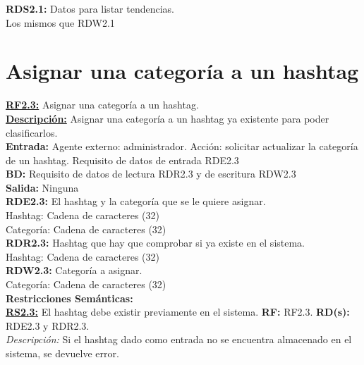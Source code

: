 \textcolor{azul}{\textbf{RDS2.1:}} Datos para listar tendencias. \\
\hspace*{1cm} Los mismos que RDW2.1\\

\pagebreak

\section{Asignar una categoría a un hashtag}
\textbf{\textcolor{rojo}{\underline{RF2.3:}}} Asignar una categoría a un hashtag. \\[6pt]

\textbf{\textcolor{rojo}{\underline{Descripción:}}} Asignar una categoría a un hashtag ya existente para poder clasificarlos.\\[6pt]

\textbf{\textcolor{rojo}{Entrada:}} Agente externo: administrador. Acción: solicitar actualizar la categoría de un hashtag. 
Requisito de datos de entrada \textcolor{azul}{RDE2.3} \\[6pt]

\textbf{\textcolor{rojo}{BD:}} Requisito de datos de lectura \textcolor{azul}{RDR2.3} y de escritura \textcolor{azul}{RDW2.3}\\[6pt]

\textbf{\textcolor{rojo}{Salida:}} Ninguna\\[6pt] 

\textcolor{azul}{\textbf{RDE2.3:}} El hashtag y la categoría que se le quiere asignar. \\
\hspace*{1cm} Hashtag: Cadena de caracteres (32)\\[12pt]
\hspace*{1cm} Categoría: Cadena de caracteres (32)\\[12pt]

\textcolor{azul}{\textbf{RDR2.3:}} Hashtag que hay que comprobar si ya existe en el sistema. \\
\hspace*{1cm} Hashtag: Cadena de caracteres (32) \\[12pt]

\textcolor{azul}{\textbf{RDW2.3:}} Categoría a asignar. \\
\hspace*{1cm} Categoría: Cadena de caracteres (32)\\[12pt]

\textbf{\textcolor{verde}{Restricciones Semánticas:}} \\[6pt]
\textbf{\textcolor{verde}{\underline{RS2.3:}}} El hashtag debe existir previamente en el sistema. \textbf{RF:} RF2.3. \textbf{RD(s):} RDE2.3 y RDR2.3. \\
\hspace*{1cm} \textit{Descripción:} Si el hashtag dado como entrada no se encuentra almacenado en el sistema, se devuelve error. \\[6pt]

